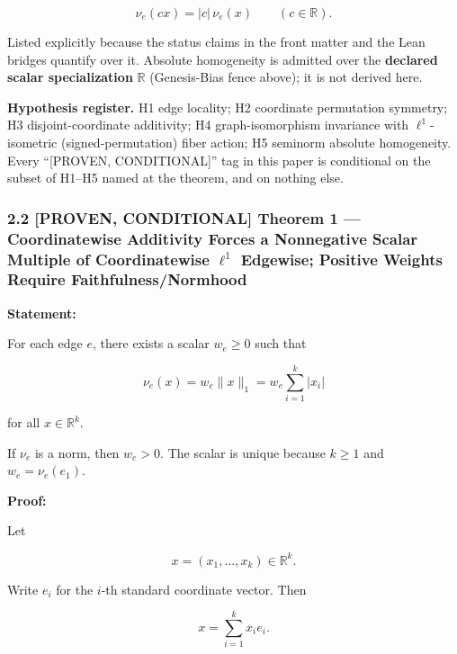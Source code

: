 \documentclass[
  11pt,
]{article}
\begin{document}
\[
\nu_e(cx)=|c|\,\nu_e(x)\qquad(c\in\mathbb R).
\]

Listed explicitly because the status claims in the front matter and the
Lean bridges quantify over it. Absolute homogeneity is admitted over the
\textbf{declared scalar specialization} \(\mathbb R\) (Genesis-Bias
fence above); it is not derived here.

\textbf{Hypothesis register.} H1 edge locality; H2 coordinate
permutation symmetry; H3 disjoint-coordinate additivity; H4
graph-isomorphism invariance with \(\ell^1\)-isometric
(signed-permutation) fiber action; H5 seminorm absolute homogeneity.
Every ``{[}PROVEN, CONDITIONAL{]}'' tag in this paper is conditional on
the subset of H1--H5 named at the theorem, and on nothing else.

\hypertarget{proven-conditional-theorem-1-coordinatewise-additivity-forces-a-nonnegative-scalar-multiple-of-coordinatewise-ell1-edgewise-positive-weights-require-faithfulnessnormhood}{%
\subsubsection{\texorpdfstring{2.2 \textbf{{[}PROVEN, CONDITIONAL{]}
Theorem 1 --- Coordinatewise Additivity Forces a Nonnegative Scalar
Multiple of Coordinatewise \(\ell^1\) Edgewise; Positive Weights Require
Faithfulness/Normhood}}{2.2 {[}PROVEN, CONDITIONAL{]} Theorem 1 --- Coordinatewise Additivity Forces a Nonnegative Scalar Multiple of Coordinatewise \textbackslash ell\^{}1 Edgewise; Positive Weights Require Faithfulness/Normhood}}\label{proven-conditional-theorem-1-coordinatewise-additivity-forces-a-nonnegative-scalar-multiple-of-coordinatewise-ell1-edgewise-positive-weights-require-faithfulnessnormhood}}

\textbf{Statement:}

For each edge \(e\), there exists a scalar \(w_e\ge0\) such that

\[
\nu_e(x)=w_e\|x\|_1 = w_e\sum_{i=1}^k |x_i|
\]

for all \(x\in\mathbb R^k\).

If \(\nu_e\) is a norm, then \(w_e>0\). The scalar is unique because
\(k\ge1\) and \(w_e=\nu_e(e_1)\).

\textbf{Proof:}

Let

\[
x=(x_1,\ldots,x_k)\in\mathbb R^k.
\]

Write \(e_i\) for the \(i\)-th standard coordinate vector. Then

\[
x=\sum_{i=1}^k x_i e_i.
\]
\end{document}
